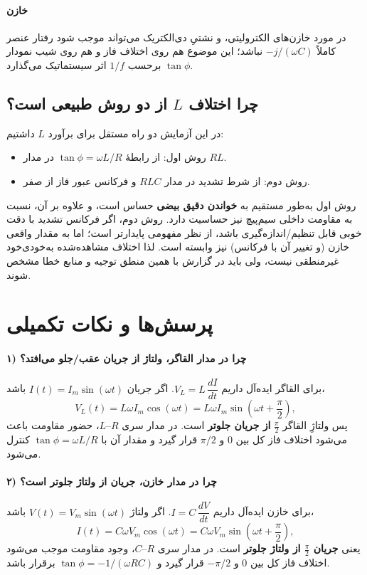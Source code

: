 \documentclass[a4paper, 11pt]{article}
\begin{document}
\paragraph{خازن}
در مورد خازن‌های الکترولیتی،  و نشتیِ دی‌الکتریک می‌تواند موجب شود رفتار عنصر کاملاً \( -j/(\omega C)\) نباشد؛ این موضوع هم روی اختلاف فاز و هم روی شیب نمودار \(\tan\phi\) برحسب \(1/f\) اثر سیستماتیک می‌گذارد.

\subsection{چرا اختلاف $L$ از دو روش طبیعی است؟}

در این آزمایش دو راه مستقل برای برآورد \(L\) داشتیم:
\begin{itemize}
    \item روش اول: از رابطهٔ \(\tan\phi=\omega L/R\) در مدار $RL$.
    \item روش دوم: از شرط تشدید در مدار $RLC$ و فرکانس عبور فاز از صفر.
\end{itemize}
روش اول به‌طور مستقیم به \textbf{خواندن دقیق بیضی} حساس است، و علاوه بر آن، نسبت به مقاومت داخلی سیم‌پیچ نیز حساسیت دارد. روش دوم، اگر فرکانس تشدید با دقت خوبی قابل تنظیم/اندازه‌گیری باشد، از نظر مفهومی پایدارتر است؛ اما به مقدار واقعی خازن (و تغییر آن با فرکانس) نیز وابسته است. لذا اختلاف مشاهده‌شده به‌خودی‌خود غیرمنطقی نیست، ولی باید در گزارش با همین منطق توجیه و منابع خطا مشخص شوند.


\section*{پرسش‌ها و نکات تکمیلی}

\paragraph{۱) چرا در مدار القاگر، ولتاژ از جریان عقب/جلو می‌افتد؟}
برای القاگر ایده‌آل داریم \(V_L=L\,\dfrac{dI}{dt}\). اگر جریان \(I(t)=I_m\sin(\omega t)\) باشد،
\[
V_L(t)=L\omega I_m\cos(\omega t)=L\omega I_m\sin\!\left(\omega t+\frac{\pi}{2}\right),
\]
پس ولتاژِ القاگر \(\frac{\pi}{2}\) \textbf{از جریان جلوتر} است. در مدار سری \(R\)–\(L\)، حضور مقاومت باعث می‌شود اختلاف فاز کل بین \(0\) و \(\pi/2\) قرار گیرد و مقدار آن با \(\tan\phi=\omega L/R\) کنترل می‌شود.

\paragraph{۲) چرا در مدار خازن، جریان از ولتاژ جلوتر است؟}
برای خازن ایده‌آل داریم \(I=C\,\dfrac{dV}{dt}\). اگر ولتاژ \(V(t)=V_m\sin(\omega t)\) باشد،
\[
I(t)=C\omega V_m\cos(\omega t)=C\omega V_m\sin\!\left(\omega t+\frac{\pi}{2}\right),
\]
یعنی \textbf{جریان \(\frac{\pi}{2}\) از ولتاژ جلوتر} است. در مدار سری \(R\)–\(C\)، وجود مقاومت موجب می‌شود اختلاف فاز کل بین \(0\) و \(-\pi/2\) قرار گیرد و \(\tan\phi=-1/(\omega RC)\) برقرار باشد.
\end{document}
